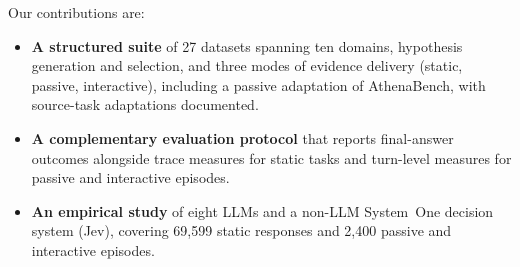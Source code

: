 Our contributions are:
\begin{itemize}
    \item \textbf{A structured suite} of 27 datasets spanning ten domains, hypothesis generation and selection, and three modes of evidence delivery (static, passive, interactive), including a passive adaptation of AthenaBench, with source-task adaptations documented.
    \item \textbf{A complementary evaluation protocol} that reports final-answer outcomes alongside trace measures for static tasks and turn-level measures for passive and interactive episodes.
    \item \textbf{An empirical study} of eight LLMs and a non-LLM System~One decision system (Jev), covering 69,599 static responses and 2,400 passive and interactive episodes.
\end{itemize}
